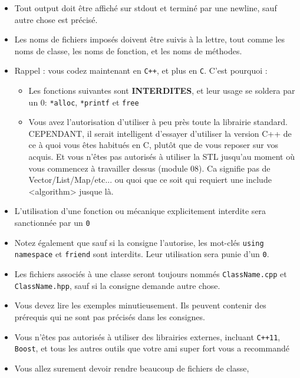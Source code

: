 \begin{itemize}
		\item Tout output doit être affiché sur stdout et terminé par une newline,
            sauf autre chose est précisé.
		\item Les noms de fichiers imposés doivent être suivis à la lettre,
            tout comme les noms de classe, les noms de fonction, et les 
            noms de méthodes.
		\item Rappel : vous codez maintenant en \texttt{C++}, et plus en
            \texttt{C}. C'est pourquoi :
            \begin{itemize}
                \item Les fonctions suivantes sont \textbf{INTERDITES}, et 
                    leur usage se soldera par un 0: \texttt{*alloc}, 
                    \texttt{*printf} et \texttt{free}
                \item Vous avez l'autorisation d'utiliser à peu près toute 
                    la librairie standard. CEPENDANT, il serait intelligent
                    d'essayer d'utiliser la version C++ de ce à quoi vous êtes
                    habitués en C, plutôt que de vous reposer sur vos acquis.
                    Et vous n'êtes pas autorisés à utiliser la STL jusqu'au 
                    moment où vous commencez à travailler dessus (module 08).
                    Ca signifie pas de Vector/List/Map/etc... ou quoi que 
                    ce soit qui requiert une include <algorithm> jusque là.
		  \end{itemize}
        \item L'utilisation d'une fonction ou mécanique explicitement interdite 
          sera sanctionnée par un \texttt{0}
        \item Notez également que sauf si la consigne l'autorise, les mot-clés
          \texttt{using namespace} et \texttt{friend} sont interdits.
          Leur utilisation sera punie d'un \texttt{0}.
        \item Les fichiers associés à une classe seront toujours nommés \texttt{ClassName.cpp}
          et \texttt{ClassName.hpp}, sauf si la consigne demande autre chose.
        \item Vous devez lire les exemples minutieusement. Ils peuvent contenir
          des prérequis qui ne sont pas précisés dans les consignes.
        \item Vous n'êtes pas autorisés à utiliser des librairies externes,
          incluant \texttt{C++11}, \texttt{Boost}, et tous les autres outils
          que votre ami super fort vous a recommandé
        \item Vous allez surement devoir rendre beaucoup de fichiers de classe,

\end{itemize}

